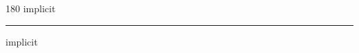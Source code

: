 
\begin{frame}
\begin{center}
\begin{turn}{180}
{\fontsize{2.5cm}{1em}\selectfont implicit}
\end{turn}
\vspace{1em}\par  
\hrule
\vspace{1em}\par  
{\fontsize{2.5cm}{1em}\selectfont implicit}
\end{center}
\end{frame}

